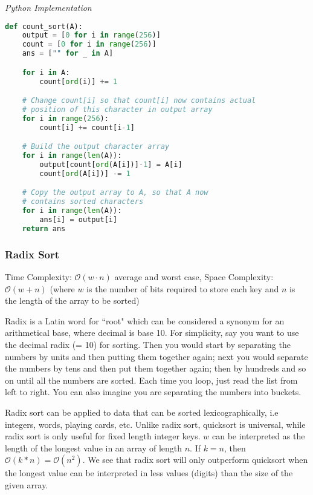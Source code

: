 \documentclass{article}
\newcommand{\bigO}{\mathcal{O}}
\begin{document}
\vspace{8pt} \emph{Python Implementation}
\begin{lstlisting}[language=Python]
def count_sort(A):
    output = [0 for i in range(256)]
    count = [0 for i in range(256)]
    ans = ["" for _ in A]

    for i in A:
        count[ord(i)] += 1

    # Change count[i] so that count[i] now contains actual
    # position of this character in output array
    for i in range(256):
        count[i] += count[i-1]

    # Build the output character array
    for i in range(len(A)):
        output[count[ord(A[i])]-1] = A[i]
        count[ord(A[i])] -= 1

    # Copy the output array to A, so that A now
    # contains sorted characters
    for i in range(len(A)):
        ans[i] = output[i]
    return ans
\end{lstlisting}

    \subsubsection{Radix Sort}
    Time Complexity: $\bigO(w \cdot n)$ average and worst case, Space Complexity: $\bigO(w + n)$ (where $w$ is the number of bits required to store each key and $n$ is the length of the array to be sorted)
    
    Radix is a Latin word for ``root" which can be considered a synonym for an arithmetical base, where decimal is base 10. For simplicity, say you want to use the decimal radix (= 10) for sorting. Then you would start by separating the numbers by units and then putting them together again; next you would separate the numbers by tens and then put them together again; then by hundreds and so on until all the numbers are sorted. Each time you loop, just read the list from left to right. You can also imagine you are separating the numbers into buckets. 
    
    Radix sort can be applied to data that can be sorted lexicographically, i.e integers, words, playing cards, etc. Unlike radix sort, quicksort is universal, while radix sort is only useful for fixed length integer keys. $w$ can be interpreted as the length of the longest value in an array of length $n$. If $k = n$, then  $\bigO(k * n) = \bigO(n^2)$. We see that radix sort will only outperform quicksort when the longest value can be interpreted in less values (digits) than the size of the given array.
    
\end{document}

